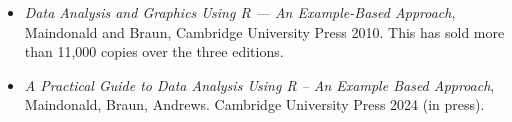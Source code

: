 \documentclass[
  10ptls,
  b5paper]{book}
\providecommand{\tightlist}{%
  \setlength{\itemsep}{0pt}\setlength{\parskip}{0pt}}
\begin{document}
\begin{itemize}
\tightlist
\item
  \emph{Data Analysis and Graphics Using R --- An Example-Based Approach}, Maindonald and Braun, Cambridge University Press 2010.
  This has sold more than 11,000 copies over the three editions.\\
\item
  \emph{A Practical Guide to Data Analysis Using R -- An Example Based Approach},
  Maindonald, Braun, Andrews. Cambridge University Press 2024 (in press).
\end{itemize}
\end{document}
